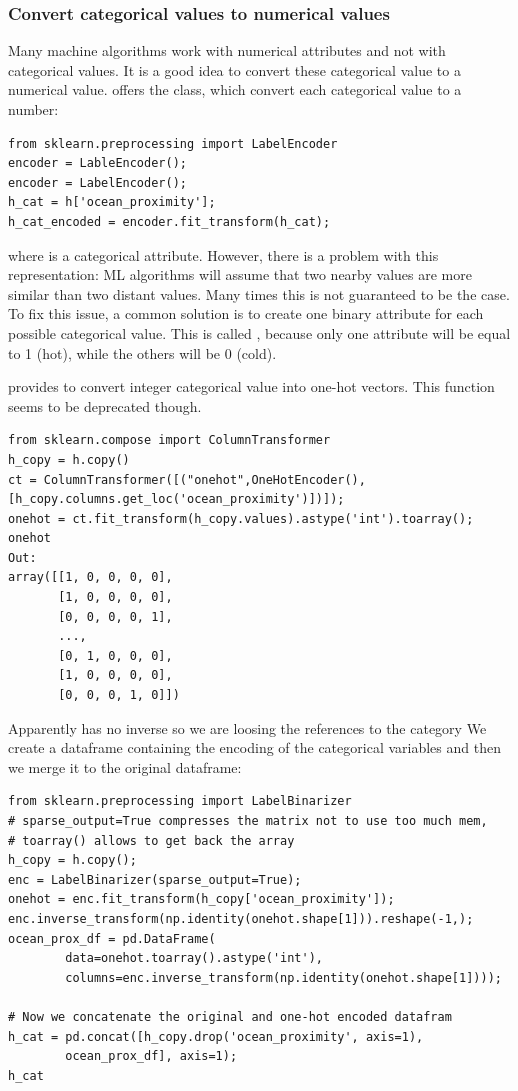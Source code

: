 \subsubsection{Convert categorical values to numerical values}
Many machine algorithms work with numerical attributes and not with categorical values. It is a good idea to convert these categorical value to a numerical value.  offers the  class, which convert each categorical value to a number:
\begin{lstlisting}[caption=Example of usage of \ti{LabelEncoder} class]
from sklearn.preprocessing import LabelEncoder
encoder = LableEncoder();
encoder = LabelEncoder();
h_cat = h['ocean_proximity'];
h_cat_encoded = encoder.fit_transform(h_cat);
\end{lstlisting}
where  is a categorical attribute. However, there is a problem with this representation:  ML algorithms will assume that two nearby values are more similar than two distant values. Many times this is not guaranteed to be the case. To fix this issue, a common solution is to create one binary attribute for each possible categorical value. This is called , because only one attribute will be equal to 1 (hot), while the others will be 0 (cold).

 provides  to convert integer categorical value into one-hot vectors. This function seems to be deprecated though.

\begin{lstlisting}[caption=Usage of \ti{ColumnTransformer}]
from sklearn.compose import ColumnTransformer
h_copy = h.copy()
ct = ColumnTransformer([("onehot",OneHotEncoder(),[h_copy.columns.get_loc('ocean_proximity')])]);
onehot = ct.fit_transform(h_copy.values).astype('int').toarray();
onehot
Out:
array([[1, 0, 0, 0, 0],
       [1, 0, 0, 0, 0],
       [0, 0, 0, 0, 1],
       ...,
       [0, 1, 0, 0, 0],
       [1, 0, 0, 0, 0],
       [0, 0, 0, 1, 0]])
\end{lstlisting}
Apparently  has no inverse so we are loosing the references to the category
We create a dataframe containing the encoding of the categorical variables and then we merge it to the original dataframe:
\begin{lstlisting}[caption=Usage of \ti{LabelBinarizer}]
from sklearn.preprocessing import LabelBinarizer
# sparse_output=True compresses the matrix not to use too much mem, 
# toarray() allows to get back the array
h_copy = h.copy();
enc = LabelBinarizer(sparse_output=True);
onehot = enc.fit_transform(h_copy['ocean_proximity']);
enc.inverse_transform(np.identity(onehot.shape[1])).reshape(-1,);
ocean_prox_df = pd.DataFrame(
		data=onehot.toarray().astype('int'), 
		columns=enc.inverse_transform(np.identity(onehot.shape[1])));

# Now we concatenate the original and one-hot encoded datafram
h_cat = pd.concat([h_copy.drop('ocean_proximity', axis=1), 
		ocean_prox_df], axis=1);
h_cat
\end{lstlisting}

